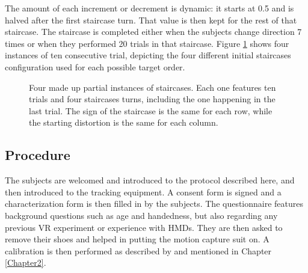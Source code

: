 The amount of each increment or decrement is dynamic: it starts at \num{0.5} and is halved after the first staircase turn. That value is then kept for the rest of that staircase. The staircase is completed either when the subjects change direction 7 times or when they performed 20 trials in that staircase. Figure \ref{fig:trials} shows four instances of ten consecutive trial, depicting the four different initial staircases configuration used for each possible target order.

\begin{figure}[h]
    \caption{Four made up partial instances of staircases. Each one features ten trials and four staircases turns, including the one happening in the last trial. The sign of the staircase is the same for each row, while the starting distortion is the same for each column.}\label{fig:trials}
\end{figure}

\subsection{Procedure}

The subjects are welcomed and introduced to the protocol described here, and then introduced to the tracking equipment. A consent form is signed and a characterization form is then filled in by the subjects. The questionnaire features background questions such as age and handedness, but also regarding any previous VR experiment or experience with HMDs. They are then asked to remove their shoes and helped in putting the motion capture suit on. A calibration is then performed as described by \cite{molla2017egocentric} and mentioned in Chapter \ref{Chapter2}.

